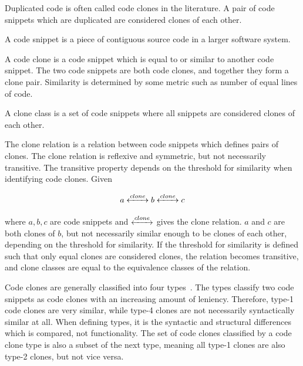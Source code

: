 Duplicated code is often called code clones in the literature. A pair of code snippets which are
duplicated are considered clones of each other.

\begin{definition}
	A code snippet is a piece of contiguous source code in a larger software system.
\end{definition}

\begin{definition}
	A code clone is a code snippet which is equal to or similar to another code snippet. The two
	code snippets are both code clones, and together they form a clone pair.
	Similarity is determined by some metric such as number of equal lines of code.
\end{definition}

\begin{definition}
	A clone class is a set of code snippets where all snippets are considered clones of each
	other.
\end{definition}


The clone relation is a relation between code snippets which defines pairs of clones. The
clone relation is reflexive and symmetric, but not necessarily transitive. The transitive
property depends on the threshold for similarity when identifying code clones. Given

$$a \xleftrightarrow{clone} b \xleftrightarrow{clone} c$$


where $a,b,c$ are code snippets and $\xleftrightarrow{clone}$ gives the clone relation.
$a$ and $c$ are both clones of $b$, but not necessarily similar enough to be clones of
each other, depending on the threshold for similarity. If the threshold for similarity is
defined such that only equal clones are considered clones, the relation becomes
transitive, and clone classes are equal to the equivalence classes of the relation.

Code clones are generally classified into four types~\cite{Inoue_introduction_to_cc}. The
types classify two code snippets as code clones with an increasing amount of leniency.
Therefore, type-1 code clones are very similar, while type-4 clones are not necessarily
syntactically similar at all. When defining types, it is the syntactic and structural
differences which is compared, not functionality. The set of code clones classified by a
code clone type is also a subset of the next type, meaning all type-1 clones are also
type-2 clones, but not vice versa.

